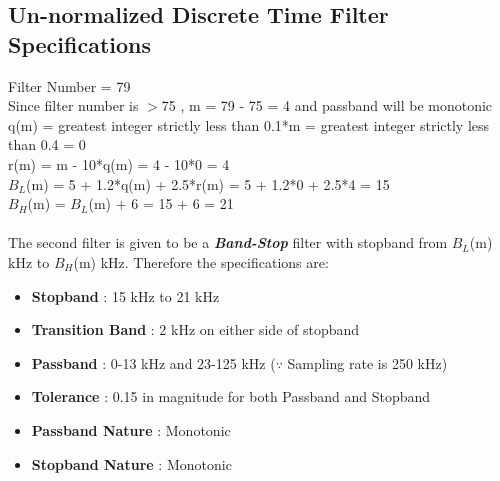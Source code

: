 \documentclass[12pt]{article}
\begin{document}
\subsection{Un-normalized Discrete Time Filter Specifications}
Filter Number = 79
\\Since filter number is $>$75 , m = 79 - 75 = 4 and passband will be monotonic\\
q(m) = greatest integer strictly less than 0.1*m = greatest integer strictly less than 0.4 = 0\\
r(m) = m - 10*q(m) = 4 - 10*0 = 4\\
$B_{L}$(m) = 5 + 1.2*q(m) + 2.5*r(m) = 5 + 1.2*0 + 2.5*4 = 15\\ 
$B_{H}$(m) = $B_{L}$(m) + 6 = 15 + 6 = 21\\ 
\\The second filter is given to be a \textbf{\textit{Band-Stop}} filter with stopband from $B_{L}$(m) kHz to $B_{H}$(m) kHz. Therefore the specifications are:
\begin{itemize}
\item \textbf{Stopband} : 15 kHz to 21 kHz
\item \textbf{Transition Band} : 2 kHz on either side of stopband
\item \textbf{Passband} : 0-13 kHz and 23-125 kHz\hspace{1.5 cm} ($\because$ Sampling rate is 250 kHz)
\item \textbf{Tolerance} : 0.15 in magnitude for both Passband and Stopband
\item \textbf{Passband Nature} : Monotonic
\item \textbf{Stopband Nature} : Monotonic
\end{itemize}
\end{document}
